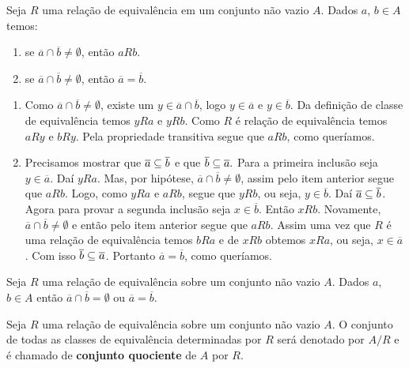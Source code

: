 \begin{proposicao}
    Seja $R$ uma relação de equivalência em um conjunto não vazio $A$. Dados $a$, $b \in A$ temos:
    \begin{enumerate}[label={\roman*})]
        \item se $\overline{a} \cap \overline{b} \ne \emptyset$, então $aRb$.
        \item se  $\overline{a} \cap \overline{b} \neq \emptyset$, então $\overline{a} = \overline{b}$.
    \end{enumerate}
\end{proposicao}
\begin{prova}
    \begin{enumerate}[label={\roman*})]
        \item Como  $\overline{a} \cap \overline{b} \ne \emptyset$, existe um $y \in \overline{a} \cap \overline{b}$, logo $y \in \overline{a}$ e $y \in \overline{b}$. Da definição de classe de equivalência temos $yRa$ e $yRb$. Como $R$ é relação de equivalência temos $aRy$ e $bRy$. Pela propriedade transitiva segue que $aRb$, como queríamos.

        \item Precisamos mostrar que $\overline{a} \subseteq \overline{b}$ e que $\overline{b} \subseteq \overline{a}.$ Para a primeira inclusão seja $y \in \overline{a}$. Daí $yRa$. Mas, por hipótese, $\overline{a}\cap\overline{b}\neq\emptyset$, assim pelo item anterior segue que $aRb$. Logo, como $yRa$ e $aRb$, segue que $yRb$, ou seja, $y \in \overline{b}$. Daí $\overline{a}\subseteq\overline{b}$. Agora para provar a segunda inclusão seja $x \in \overline{b}$. Então $xRb$. Novamente, $\overline{a} \cap \overline{b} \ne \emptyset$ e então pelo item anterior segue que $aRb$. Assim uma vez que $R$ é uma relação de equivalência temos $bRa$ e de $xRb$ obtemos $xRa$, ou seja, $x \in \overline{a}$. Com isso $\overline{b} \subseteq \overline{a}$. Portanto $\overline{a} = \overline{b}$, como queríamos.
    \end{enumerate}
\end{prova}

\begin{corolario}
    Seja $R$ uma relação de equivalência sobre um conjunto não vazio $A$. Dados $a$, $b \in A$ então $\overline{a} \cap \overline{b} = \emptyset$ ou $\overline{a} = \overline{b}$.
\end{corolario}

\begin{definicao}
    Seja $R$ uma relação de equivalência sobre um conjunto não vazio $A$. O conjunto de todas as classes de equivalência determinadas por $R$ ser{á} denotado por $A/R$ e é chamado de \textbf{conjunto quociente} de $A$ por $R$.
\end{definicao}

